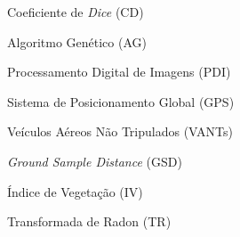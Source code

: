 
Coeficiente de \textit{Dice} (CD)

Algoritmo Genético (AG)

Processamento Digital de Imagens (PDI)

Sistema de Posicionamento Global (GPS)

Veículos Aéreos Não Tripulados (VANTs)

\textit{Ground Sample Distance} (GSD)

Índice de Vegetação (IV)

Transformada de Radon (TR)
